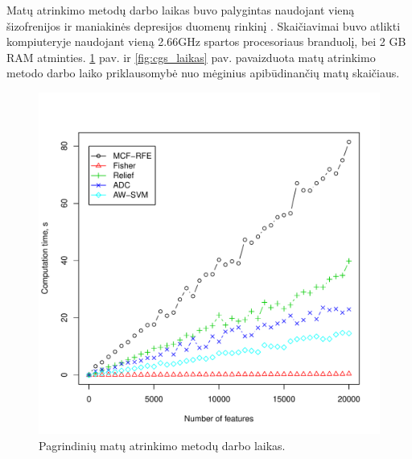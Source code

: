 Matų atrinkimo metodų darbo laikas buvo palygintas naudojant vieną šizofrenijos ir maniakinės depresijos duomenų rinkinį \cite{altara}. Skaičiavimai buvo atlikti kompiuteryje naudojant vieną 2.66GHz spartos procesoriaus branduolį, bei 2 GB RAM atminties. \ref{fig:visu_laikas} pav. ir \ref{fig:cgs_laikas} pav. pavaizduota matų atrinkimo metodo darbo laiko priklausomybė nuo mėginius apibūdinančių matų skaičiaus. 
\begin{figure}[ht]
\begin{minipage}[b]{0.5\linewidth}
\centering
\includegraphics[width=1\textwidth]{images/all_performance.pdf}
 \caption{Pagrindinių matų atrinkimo metodų darbo laikas.}
 \label{fig:visu_laikas}
\end{minipage}
\hspace{0.1cm}
\begin{minipage}[b]{0.5\linewidth}
\centering

\end{minipage}
\end{figure}
